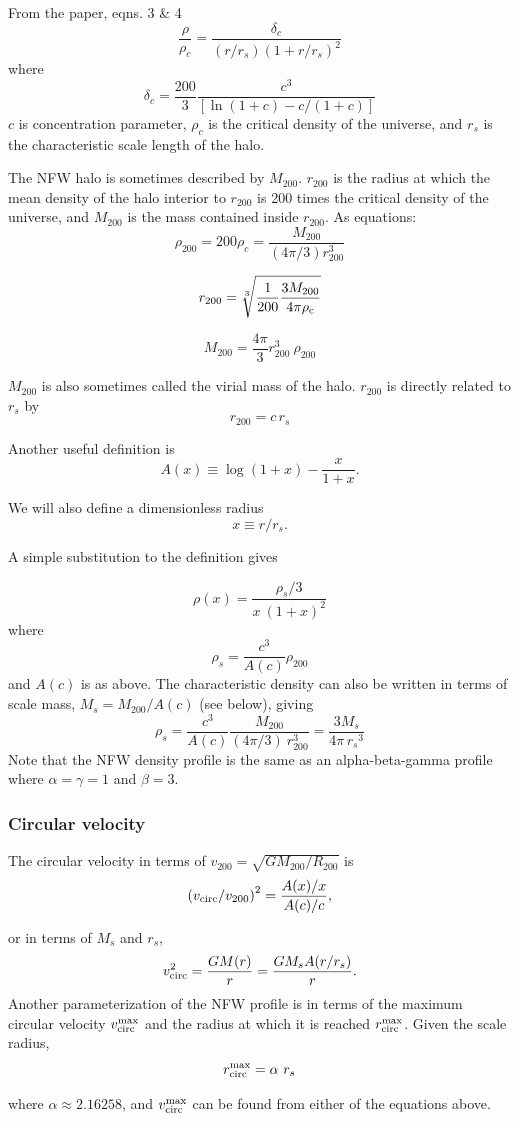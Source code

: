 From the \citet{nfw1996} paper, eqns. 3 \& 4 \[
\frac{\rho}{\rho_c} = \frac{\delta_c}{(r/r_s)(1+r/r_s)^2}
\] where \[
\delta_c = \frac{200}{3}\frac{c^3}{[\ln(1+c)-c/(1+c)]}
\] \(c\) is concentration parameter, \(\rho_c\) is the critical density
of the universe, and \(r_s\) is the characteristic scale length of the
halo.

The NFW halo is sometimes described by \(M_{200}\). \(r_{200}\) is the
radius at which the mean density of the halo interior to \(r_{200}\) is
200 times the critical density of the universe, and \(M_{200}\) is the
mass contained inside \(r_{200}\). As equations: \[
\rho_{200} = 200\rho_{c} = \frac{M_{200}}{(4\pi/3) r_{200}^3}
\]

\[
r_{200} = \sqrt[3]{\frac{1}{200}\frac{3M_{200}}{4\pi \rho_{\rm c
}}}
\]

\[
M_{200} = \frac{4\pi}{3} r_{200}^3\ \rho_{200}
\]

\(M_{200}\) is also sometimes called the virial mass of the halo.
\(r_{200}\) is directly related to \(r_s\) by \[
r_{200} = c\,r_s
\]

Another useful definition is \[
A(x) \equiv \log (1+x) - \frac{x}{1+x}.
\]

We will also define a dimensionless radius \[
x \equiv r/r_s.
\]

A simple substitution to the definition gives

\[
\rho(x) =  \frac{\rho_s/3}{x\ (1+x)^2}
\] where \[
\rho_s = \frac{c^3}{A(c)} \rho_{200}
\] and \(A(c)\) is as above. The characteristic density can also be
written in terms of scale mass, \(M_s = M_{200}/{A(c)}\) (see below),
giving \[
\rho_s = \frac{c^3}{A(c)} \frac{M_{200}}{(4\pi/3)\ r_{200}^3}  = \frac{3M_s}{4\pi\, {r_s}^3}
\] Note that the NFW density profile is the same as an alpha-beta-gamma
profile where \(\alpha=\gamma=1\) and \(\beta =3\).

\subsubsection{Circular velocity}\label{circular-velocity}

The circular velocity in terms of
\(v_{200} = \sqrt{G M_{200} / R_{200}}\) is \[
\left(v_{\rm circ}/v_{200}\right)^2 = \frac{A(x)/x}{A(c)/c},
\]

or in terms of \(M_s\) and \(r_s\), \[
v_{\rm circ}^2 = \frac{G M(r)}{r} = \frac{G M_s A(r/r_s)}{r}.
\] Another parameterization of the NFW profile is in terms of the
maximum circular velocity \(v_{\rm circ}^{\rm max}\) and the radius at
which it is reached \(r_{\rm circ}^{\rm max}\). Given the scale radius,
\[
r_{\rm circ}^{\rm max} = \alpha\ r_s
\]

where \(\alpha\approx2.16258\), and \(v_{\rm circ}^{\rm max}\) can be
found from either of the equations above.
